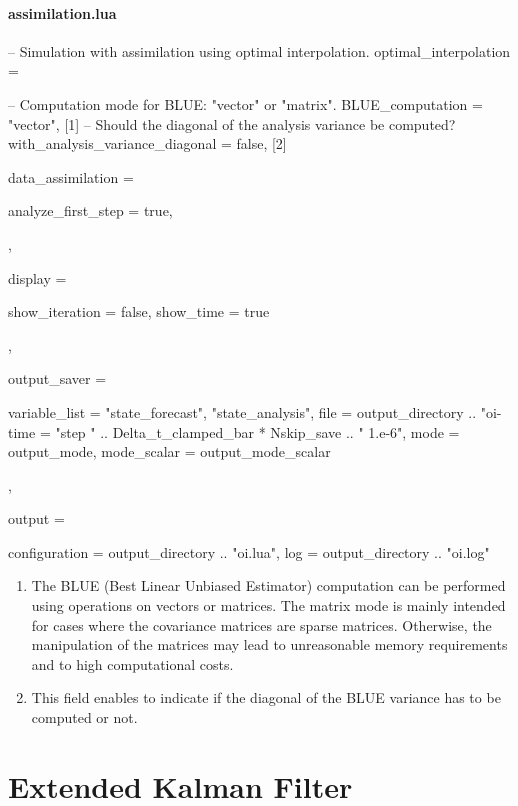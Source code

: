 \documentclass{tufte-book}
\begin{document}
 \paragraph{assimilation.lua}
 \begin{frame_lua}
 -- Simulation with assimilation using optimal interpolation.
optimal_interpolation = {

   -- Computation mode for BLUE: "vector" or "matrix".
   BLUE_computation = "vector", [1]
   -- Should the diagonal of the analysis variance be computed?
   with_analysis_variance_diagonal = false, [2]

   data_assimilation = {

      analyze_first_step = true,

   },

   display = {

      show_iteration = false,
      show_time = true
   },

   output_saver = {

      variable_list = {"state_forecast", "state_analysis"},
      file = output_directory .. "oi-%
      time = "step " .. Delta_t_clamped_bar * Nskip_save .. " 1.e-6",
      mode = output_mode,
      mode_scalar = output_mode_scalar

   },

   output = {

      configuration = output_directory .. "oi.lua",
      log = output_directory .. "oi.log"

   }

}
 \end{frame_lua}

 \begin{enumerate}

\item The BLUE (Best Linear Unbiased Estimator) computation can be performed using operations on vectors or matrices.
 The matrix mode is mainly intended for cases where the covariance matrices
      are sparse matrices. Otherwise, the manipulation of the matrices may
      lead to unreasonable memory requirements and to high computational
      costs.

 \item This field enables to indicate if the diagonal of the BLUE variance has to be computed or not.

 \end{enumerate}

 \hypertarget{extended_kalman_filter}{}\section{\-Extended Kalman Filter}\label{extended_kalman_filter}
\end{document}
